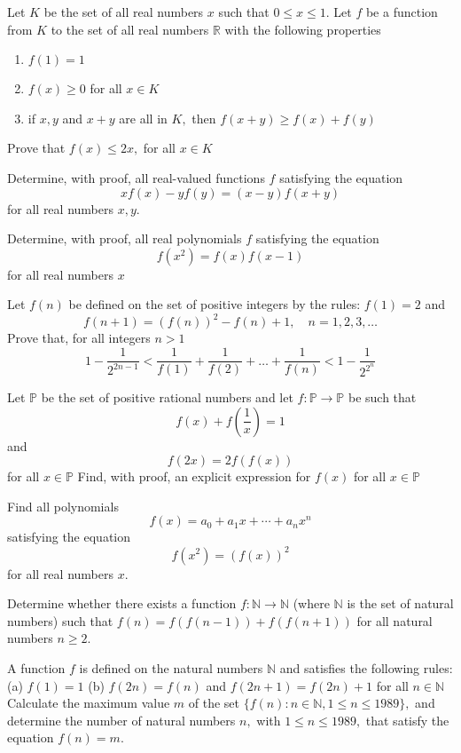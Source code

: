 \documentclass{pset}
\begin{document}
\begin{problems}
\begin{problem}[IrMO 1996] Let \(K\) be the set of all real numbers \(x\) such that \(0 \leq x \leq 1 .\) Let \(f\) be a function from \(K\) to the set
of all real numbers \(\mathbb{R}\) with the following properties
\begin{enumerate}
    \item \(f(1)=1\)
    \item \(f(x) \geq 0\) for all \(x \in K\)
    \item if \(x, y\) and \(x+y\) are all in \(K,\) then \(f(x+y) \geq f(x)+f(y)\)
\end{enumerate}
Prove that \(f(x) \leq 2 x,\) for all \(x \in K\)
\end{problem}
\begin{problem}[IrMO 1995] Determine, with proof, all real-valued functions \(f\) satisfying the equation
$$
x f(x)-y f(y)=(x-y) f(x+y)
$$
for all real numbers \(x, y\).\end{problem}
\begin{problem}[IrMO 1994] Determine, with proof, all real polynomials \(f\) satisfying the equation
$$
f\left(x^{2}\right)=f(x) f(x-1)
$$
for all real numbers \(x\)\end{problem}
\begin{problem}[IrMO 1994] Let \(f(n)\) be defined on the set of positive integers by the rules: \(f(1)=2\) and
$$
f(n+1)=(f(n))^{2}-f(n)+1, \quad n=1,2,3, \ldots
$$
Prove that, for all integers \(n>1\)
$$
1-\frac{1}{2^{2 n-1}}<\frac{1}{f(1)}+\frac{1}{f(2)}+\ldots+\frac{1}{f(n)}<1-\frac{1}{2^{2^{n}}}
$$
\end{problem}
\begin{problem}[IrMO 1991] Let \(\mathbb{P}\) be the set of positive rational numbers and let \(f: \mathbb{P} \rightarrow \mathbb{P}\) be such that
$$
f(x)+f\left(\frac{1}{x}\right)=1
$$
and
$$
f(2 x)=2 f(f(x))
$$
for all \(x \in \mathbb{P}\)
Find, with proof, an explicit expression for \(f(x)\) for all \(x \in \mathbb{P}\)\end{problem}
\begin{problem}[IrMO 1991] Find all polynomials
$$
f(x)=a_{0}+a_{1} x+\cdots+a_{n} x^{n}
$$
satisfying the equation
$$
f\left(x^{2}\right)=(f(x))^{2}
$$
for all real numbers \(x\).\end{problem}
\begin{problem}[IrMO 1990] Determine whether there exists a function \(f: \mathbb{N} \rightarrow \mathbb{N}\) (where \(\mathbb{N}\) is the set of natural numbers) such that
\(f(n)=f(f(n-1))+f(f(n+1))\)
for all natural numbers \(n \geq 2\).\end{problem}
\begin{problem}[IrMO 1989] A function \(f\) is defined on the natural numbers \(\mathbb{N}\) and satisfies the following rules:
(a) \(f(1)=1\)
(b) \(f(2 n)=f(n)\) and \(f(2 n+1)=f(2 n)+1\) for all \(n \in \mathbb{N}\)
Calculate the maximum value \(m\) of the set \(\{f(n): n \in \mathbb{N}, 1 \leq n \leq 1989\},\) and determine the number
of natural numbers \(n,\) with \(1 \leq n \leq 1989,\) that satisfy the equation \(f(n)=m\).
\end{problem}
\end{problems}
\end{document}
